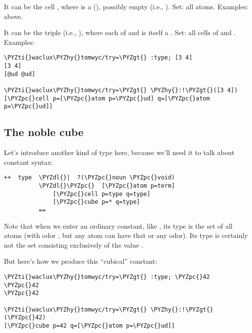 It can be the cell \kode{[\%atom p]}, where  is a  (),
possibly empty (i.e., ).  Set: all atoms.  Examples: above.

It can be the triple \kode{[\%cell p q]} (i.e., \kode{[\%cell [p q]]}), where
each of  and  is itself a .  Set: all cells of 
and .  Examples:

\begin{framed_shaded}
\begin{Verbatim}[fontsize=\relsize{-2.5},fontseries=b,commandchars=\\\{\}]
\PYZti{}waclux\PYZhy{}tomwyc/try=\PYZgt{} :type; [3 4]
[3 4]
[@ud @ud]

\PYZti{}waclux\PYZhy{}tomwyc/try=\PYZgt{} \PYZhy{}:!\PYZgt{}([3 4])
[\PYZpc{}cell p=[\PYZpc{}atom p=\PYZpc{}ud] q=[\PYZpc{}atom p=\PYZpc{}ud]]
\end{Verbatim}
\end{framed_shaded}

\subsection{The noble cube}

Let's introduce another kind of type here, because we'll need it
to talk about constant syntax:

\begin{framed_shaded}
\begin{Verbatim}[fontsize=\relsize{-2.5},fontseries=b,commandchars=\\\{\}]
++  type  \PYZdl{}|  ?(\PYZpc{}noun \PYZpc{}void)
          \PYZdl{}\PYZpc{}  [\PYZpc{}atom p=term]
              [\PYZpc{}cell p=type q=type]
              [\PYZpc{}cube p=* q=type]
          ==
\end{Verbatim}
\end{framed_shaded}

Note that when we enter an ordinary constant, like , its type
\kode{[\%atom \%ud]} is the set of all atoms (with odor , but any
atom can have that or any odor).  Its type is certainly not the
set consisting exclusively of the value .

But here's how we produce this ``cubical'' constant:

\begin{framed_shaded}
\begin{Verbatim}[fontsize=\relsize{-2.5},fontseries=b,commandchars=\\\{\}]
\PYZti{}waclux\PYZhy{}tomwyc/try=\PYZgt{} :type; \PYZpc{}42
\PYZpc{}42
\PYZpc{}42

\PYZti{}waclux\PYZhy{}tomwyc/try=\PYZgt{} \PYZhy{}:!\PYZgt{}(\PYZpc{}42)
[\PYZpc{}cube p=42 q=[\PYZpc{}atom p=\PYZpc{}ud]]
\end{Verbatim}
\end{framed_shaded}

